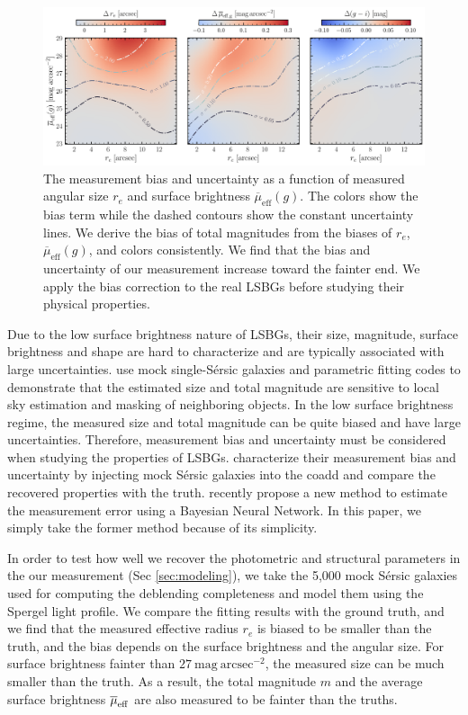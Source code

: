 \documentclass[twocolumn,astrosymb,twocolappendix]{aastex631}
\newcommand{\sbunit}{\mathrm{mag\ arcsec}^{-2}}
\newcommand{\sbeff}{\overline{\mu}_{\mathrm{eff}}(g)}
\newcommand{\sersic}{S\'ersic}
\begin{document}
\begin{CJK*}{UTF8}{gbsn}
\begin{figure}
	\vbox{ 
		\centering
		\includegraphics[width=1\linewidth]{meas_error_spergel.pdf}
	}
    \caption{The measurement bias and uncertainty as a function of measured angular size $r_e$ and surface brightness $\sbeff$. The colors show the bias term while the dashed contours show the constant uncertainty lines. We derive the bias of total magnitudes from the biases of $r_e$, $\sbeff$, and colors consistently. We find that the bias and uncertainty of our measurement increase toward the fainter end. We apply the bias correction to the real LSBGs before studying their physical properties.}
    \label{fig:meas_err}
\end{figure}


Due to the low surface brightness nature of LSBGs, their size, magnitude, surface brightness and shape are hard to characterize and are typically associated with large uncertainties. \citet{Haussler2007} use mock single-\sersic{} galaxies and parametric fitting codes to demonstrate that the estimated size and total magnitude are sensitive to local sky estimation and masking of neighboring objects. In the low surface brightness regime, the measured size and total magnitude can be quite biased and have large uncertainties. Therefore, measurement bias and uncertainty must be considered when studying the properties of LSBGs. \citet{Zaritsky2021,Zaritsky2022} characterize their measurement bias and uncertainty by injecting mock \sersic{} galaxies into the coadd and compare the recovered properties with the truth. \citet{Tanoglidis2022ICML} recently propose a new method to estimate the measurement error using a Bayesian Neural Network. In this paper, we simply take the former method because of its simplicity. 

In order to test how well we recover the photometric and structural parameters in the our measurement (Sec \ref{sec:modeling}), we take the 5,000 mock \sersic{} galaxies used for computing the deblending completeness and model them using the Spergel light profile. We compare the fitting results with the ground truth, and we find that the measured effective radius $r_e$ is biased to be smaller than the truth, and the bias depends on the surface brightness and the angular size. For surface brightness fainter than $27\ \sbunit$, the measured size can be much smaller than the truth. As a result, the total magnitude $m$ and the average surface brightness $\overline{\mu}_{\rm eff}$ are also measured to be fainter than the truths. 


\end{CJK*}
\end{document}
